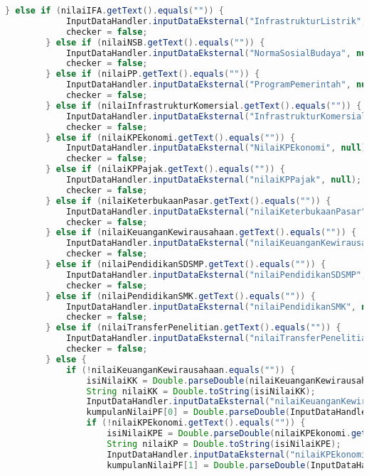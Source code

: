 \begin{lstlisting}[language=Java, caption=TampilanKondisiEksternal.java]
        } else if (nilaiIFA.getText().equals("")) {
            InputDataHandler.inputDataEksternal("InfrastrukturListrik", null);
            checker = false;
        } else if (nilaiNSB.getText().equals("")) {
            InputDataHandler.inputDataEksternal("NormaSosialBudaya", null);
            checker = false;
        } else if (nilaiPP.getText().equals("")) {
            InputDataHandler.inputDataEksternal("ProgramPemerintah", null);
            checker = false;
        } else if (nilaiInfrastrukturKomersial.getText().equals("")) {
            InputDataHandler.inputDataEksternal("InfrastrukturKomersial", null);
            checker = false;
        } else if (nilaiKPEkonomi.getText().equals("")) {
            InputDataHandler.inputDataEksternal("NilaiKPEkonomi", null);
            checker = false;
        } else if (nilaiKPPajak.getText().equals("")) {
            InputDataHandler.inputDataEksternal("nilaiKPPajak", null);
            checker = false;
        } else if (nilaiKeterbukaanPasar.getText().equals("")) {
            InputDataHandler.inputDataEksternal("nilaiKeterbukaanPasar", null);
            checker = false;
        } else if (nilaiKeuanganKewirausahaan.getText().equals("")) {
            InputDataHandler.inputDataEksternal("nilaiKeuanganKewirausahaan", null);
            checker = false;
        } else if (nilaiPendidikanSDSMP.getText().equals("")) {
            InputDataHandler.inputDataEksternal("nilaiPendidikanSDSMP", null);
            checker = false;
        } else if (nilaiPendidikanSMK.getText().equals("")) {
            InputDataHandler.inputDataEksternal("nilaiPendidikanSMK", null);
            checker = false;
        } else if (nilaiTransferPenelitian.getText().equals("")) {
            InputDataHandler.inputDataEksternal("nilaiTransferPenelitian", null);
            checker = false;
        } else {
            if (!nilaiKeuanganKewirausahaan.equals("")) {
                isiNilaiKK = Double.parseDouble(nilaiKeuanganKewirausahaan.getText()) / 100.0;
                String nilaiKK = Double.toString(isiNilaiKK);
                InputDataHandler.inputDataEksternal("nilaiKeuanganKewirausahaan", nilaiKK);
                kumpulanNilaiPF[0] = Double.parseDouble(InputDataHandler.getValue("nilaiKeuanganKewirausahaan"));
                if (!nilaiKPEkonomi.getText().equals("")) {
                    isiNilaiKPE = Double.parseDouble(nilaiKPEkonomi.getText()) / 100.0;
                    String nilaiKP = Double.toString(isiNilaiKPE);
                    InputDataHandler.inputDataEksternal("nilaiKPEkonomi", nilaiKP);
                    kumpulanNilaiPF[1] = Double.parseDouble(InputDataHandler.getValue("nilaiKPEkonomi"));

\end{lstlisting}
